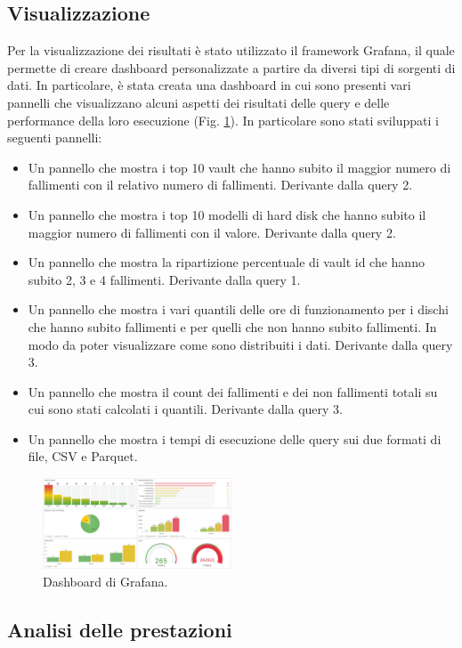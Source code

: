 \documentclass[conference]{IEEEtran}
\begin{document}
\subsection{Visualizzazione}
Per la visualizzazione dei risultati è stato utilizzato il framework Grafana, il quale permette di creare dashboard personalizzate a partire da diversi tipi di sorgenti di dati. In particolare, è stata creata una dashboard in cui sono presenti vari pannelli che visualizzano alcuni aspetti dei risultati delle query e delle performance della loro esecuzione (Fig. \ref{fig:grafana_dashboard}).
In particolare sono stati sviluppati i seguenti pannelli:
\begin{itemize}
    \item Un pannello che mostra i top 10 vault che hanno subito il maggior numero di fallimenti con il relativo numero di fallimenti. Derivante dalla query 2.
    \item Un pannello che mostra i top 10 modelli di hard disk che hanno subito il maggior numero di fallimenti con il valore. Derivante dalla query 2.
    \item Un pannello che mostra la ripartizione percentuale di vault id che hanno subito 2, 3 e 4 fallimenti. Derivante dalla query 1.
    \item Un pannello che mostra i vari quantili delle ore di funzionamento per i dischi che hanno subito fallimenti e per quelli che non hanno subito fallimenti. In modo da poter visualizzare come sono distribuiti i dati. Derivante dalla query 3.
    \item Un pannello che mostra il count dei fallimenti e dei non fallimenti totali su cui sono stati calcolati i quantili. Derivante dalla query 3.
    \item Un pannello che mostra i tempi di esecuzione delle query sui due formati di file, CSV e Parquet.
\end{itemize}
\begin{figure}[H]
    \centerline{\includegraphics[width=0.5\textwidth]{res/grafana_dashboard.png}}
    \caption{Dashboard di Grafana.}
    \label{fig:grafana_dashboard}
\end{figure}
\subsection{Analisi delle prestazioni}
\end{document}
